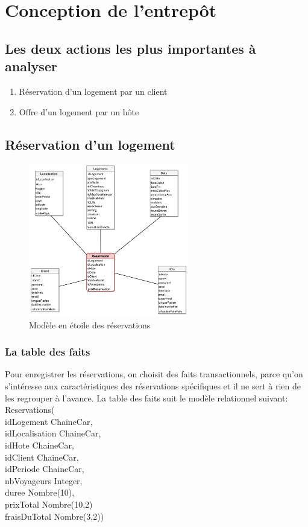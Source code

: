 \documentclass[11pt]{article}
\begin{document}
\section{Conception de l'entrepôt}
\subsection{Les deux actions les plus importantes à analyser}
\begin{enumerate}
	\item Réservation d'un logement par un client
	\item Offre d'un logement par un hôte
\end{enumerate}
\subsection{Réservation d'un logement}
\begin{figure}[h]
	\centering
	\includegraphics*[width=7cm]{../reservationFait_final.jpg}
	\caption{Modèle en étoile des réservations}
\end{figure}

\subsubsection*{La table des faits}
Pour enregistrer les réservations, on choisit des faits transactionnels, parce qu'on s'intéresse aux caractéristiques des réservations spécifiques et il ne sert à rien de les regrouper à l'avance. La table des faits suit le modèle relationnel suivant:\\
Reservations(\\
idLogement ChaineCar,\\
idLocalisation ChaineCar,\\
idHote ChaineCar,\\
idClient ChaineCar,\\
idPeriode ChaineCar,\\
nbVoyageurs Integer,\\
duree Nombre(10),\\
prixTotal Nombre(10,2)\\
fraisDuTotal Nombre(3,2))
\end{document}
